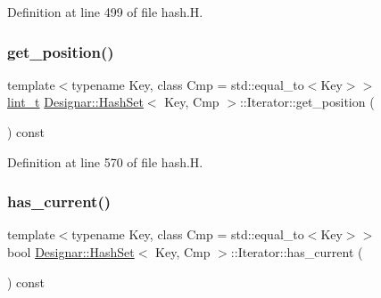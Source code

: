 Definition at line 499 of file hash.\+H.

\mbox{\label{class_designar_1_1_hash_set_1_1_iterator_a12b236661945aa10228f0523b6e1ab5e}} 
\subsubsection{\texorpdfstring{get\+\_\+position()}{get\_position()}}
{\footnotesize\ttfamily template$<$typename Key, class Cmp = std\+::equal\+\_\+to$<$\+Key$>$$>$ \\
\hyperlink{namespace_designar_a9d113d66a39e82b73727c72cd3a52f73}{lint\+\_\+t} \hyperlink{class_designar_1_1_hash_set}{Designar\+::\+Hash\+Set}$<$ Key, Cmp $>$\+::Iterator\+::get\+\_\+position (\begin{DoxyParamCaption}{ }\end{DoxyParamCaption}) const\hspace{0.3cm}{\ttfamily [inline]}}



Definition at line 570 of file hash.\+H.

\mbox{\label{class_designar_1_1_hash_set_1_1_iterator_a13dc6ab67d6d4a380e2f1cb4fd6d3ae2}} 
\subsubsection{\texorpdfstring{has\+\_\+current()}{has\_current()}}
{\footnotesize\ttfamily template$<$typename Key, class Cmp = std\+::equal\+\_\+to$<$\+Key$>$$>$ \\
bool \hyperlink{class_designar_1_1_hash_set}{Designar\+::\+Hash\+Set}$<$ Key, Cmp $>$\+::Iterator\+::has\+\_\+current (\begin{DoxyParamCaption}{ }\end{DoxyParamCaption}) const\hspace{0.3cm}{\ttfamily [inline]}}



